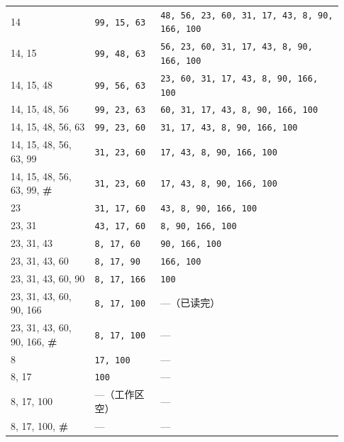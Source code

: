 \documentclass[11pt,openany,UTF8]{ctexbook}
\begin{document}
\begin{longtable}{@{}L{0.2358\linewidth}L{0.1856\linewidth}L{0.5070\linewidth}@{}}
14 & \texttt{99,\allowbreak{} 15,\allowbreak{} 63} & \texttt{48,\allowbreak{} 56,\allowbreak{} 23,\allowbreak{} 60,\allowbreak{} 31,\allowbreak{} 17,\allowbreak{} 43,\allowbreak{} 8,\allowbreak{} 90,\allowbreak{} 166,\allowbreak{} 100} \\
14, 15 & \texttt{99,\allowbreak{} 48,\allowbreak{} 63} & \texttt{56,\allowbreak{} 23,\allowbreak{} 60,\allowbreak{} 31,\allowbreak{} 17,\allowbreak{} 43,\allowbreak{} 8,\allowbreak{} 90,\allowbreak{} 166,\allowbreak{} 100} \\
14, 15, 48 & \texttt{99,\allowbreak{} 56,\allowbreak{} 63} & \texttt{23,\allowbreak{} 60,\allowbreak{} 31,\allowbreak{} 17,\allowbreak{} 43,\allowbreak{} 8,\allowbreak{} 90,\allowbreak{} 166,\allowbreak{} 100} \\
14, 15, 48, 56 & \texttt{99,\allowbreak{} 23,\allowbreak{} 63} & \texttt{60,\allowbreak{} 31,\allowbreak{} 17,\allowbreak{} 43,\allowbreak{} 8,\allowbreak{} 90,\allowbreak{} 166,\allowbreak{} 100} \\
14, 15, 48, 56, 63 & \texttt{99,\allowbreak{} 23,\allowbreak{} 60} & \texttt{31,\allowbreak{} 17,\allowbreak{} 43,\allowbreak{} 8,\allowbreak{} 90,\allowbreak{} 166,\allowbreak{} 100} \\
14, 15, 48, 56, 63, 99 & \texttt{31,\allowbreak{} 23,\allowbreak{} 60} & \texttt{17,\allowbreak{} 43,\allowbreak{} 8,\allowbreak{} 90,\allowbreak{} 166,\allowbreak{} 100} \\
14, 15, 48, 56, 63, 99, \textbf{\#} & \texttt{31,\allowbreak{} 23,\allowbreak{} 60} & \texttt{17,\allowbreak{} 43,\allowbreak{} 8,\allowbreak{} 90,\allowbreak{} 166,\allowbreak{} 100} \\
23 & \texttt{31,\allowbreak{} 17,\allowbreak{} 60} & \texttt{43,\allowbreak{} 8,\allowbreak{} 90,\allowbreak{} 166,\allowbreak{} 100} \\
23, 31 & \texttt{43,\allowbreak{} 17,\allowbreak{} 60} & \texttt{8,\allowbreak{} 90,\allowbreak{} 166,\allowbreak{} 100} \\
23, 31, 43 & \texttt{8,\allowbreak{} 17,\allowbreak{} 60} & \texttt{90,\allowbreak{} 166,\allowbreak{} 100} \\
23, 31, 43, 60 & \texttt{8,\allowbreak{} 17,\allowbreak{} 90} & \texttt{166,\allowbreak{} 100} \\
23, 31, 43, 60, 90 & \texttt{8,\allowbreak{} 17,\allowbreak{} 166} & \texttt{100} \\
23, 31, 43, 60, 90, 166 & \texttt{8,\allowbreak{} 17,\allowbreak{} 100} & —（已读完） \\
23, 31, 43, 60, 90, 166, \textbf{\#} & \texttt{8,\allowbreak{} 17,\allowbreak{} 100} & — \\
8 & \texttt{17,\allowbreak{} 100} & — \\
8, 17 & \texttt{100} & — \\
8, 17, 100 & —（工作区空） & — \\
8, 17, 100, \textbf{\#} & — & — \\
\bottomrule
\end{longtable}
\endgroup
\end{document}
